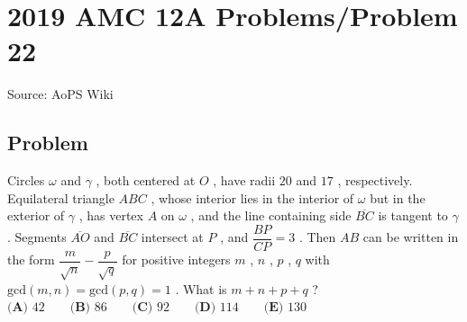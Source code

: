 \documentclass[12pt]{article}
\begin{document}
\section*{{2019 AMC 12A Problems/Problem 22}}
Source: AoPS Wiki

\subsection*{Problem}
Circles $\omega$ and $\gamma$ , both centered at $O$ , have radii $20$ and $17$ , respectively. Equilateral triangle $ABC$ , whose interior lies in the interior of $\omega$ but in the exterior of $\gamma$ , has vertex $A$ on $\omega$ , and the line containing side $\overline{BC}$ is tangent to $\gamma$ . Segments $\overline{AO}$ and $\overline{BC}$ intersect at $P$ , and $\dfrac{BP}{CP} = 3$ . Then $AB$ can be written in the form $\dfrac{m}{\sqrt{n}} - \dfrac{p}{\sqrt{q}}$ for positive integers $m$ , $n$ , $p$ , $q$ with $\text{gcd}(m,n) = \text{gcd}(p,q) = 1$ . What is $m+n+p+q$ ? $\phantom{}$ $\textbf{(A) } 42 \qquad \textbf{(B) }86 \qquad \textbf{(C) } 92 \qquad \textbf{(D) } 114 \qquad \textbf{(E) } 130$
\end{document}
